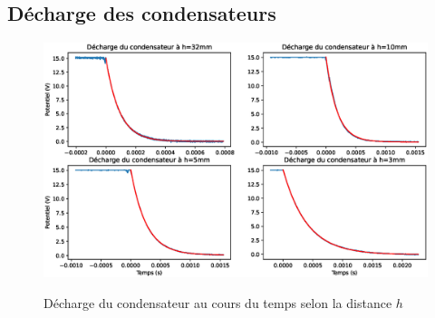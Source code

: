 \documentclass[12pt]{article}
\begin{document}
	\break
	
	\subsection*{Décharge des condensateurs}
	\begin{figure}[!h]
		\centering
		\includegraphics[width=1\textwidth]{img/decharge.eps}
		\label{fig:decharge}
		\caption{Décharge du condensateur au cours du temps selon la distance $h$}
	\end{figure}
\end{document}
